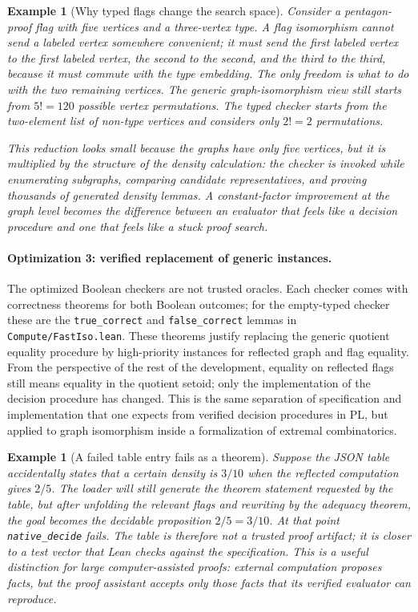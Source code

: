 \documentclass{article}
\newtheorem{example}[theorem]{Example}
\newcommand{\lean}[1]{\texttt{#1}}
\begin{document}
\begin{example}[Why typed flags change the search space]
  Consider a pentagon-proof flag with five vertices and a three-vertex type.
  A flag isomorphism cannot send a labeled vertex somewhere convenient; it must
  send the first labeled vertex to the first labeled vertex, the second to the
  second, and the third to the third, because it must commute with the type
  embedding.  The only freedom is what to do with the two remaining vertices.
  The generic graph-isomorphism view still starts from $5! = 120$ possible
  vertex permutations.  The typed checker starts from the two-element list of
  non-type vertices and considers only $2! = 2$ permutations.

  This reduction looks small because the graphs have only five vertices, but
  it is multiplied by the structure of the density calculation: the checker is
  invoked while enumerating subgraphs, comparing candidate representatives,
  and proving thousands of generated density lemmas.  A constant-factor
  improvement at the graph level becomes the difference between an evaluator
  that feels like a decision procedure and one that feels like a stuck proof
  search.
\end{example}

\paragraph{Optimization 3: verified replacement of generic instances.}
The optimized Boolean checkers are not trusted oracles.  Each checker comes
with correctness theorems for both Boolean outcomes; for the empty-typed
checker these are the \lean{true\_correct} and \lean{false\_correct} lemmas in
\lean{Compute/FastIso.lean}.  These theorems justify replacing the generic
quotient equality procedure by high-priority instances for reflected graph and
flag equality.  From the perspective of the rest of the development, equality
on reflected flags still means equality in the quotient setoid; only the
implementation of the decision procedure has changed.
This is the same separation of specification and implementation that one
expects from verified decision procedures in PL, but applied to graph
isomorphism inside a formalization of extremal combinatorics.

\begin{example}[A failed table entry fails as a theorem]
  Suppose the JSON table accidentally states that a certain density is
  $3/10$ when the reflected computation gives $2/5$.  The loader will still
  generate the theorem statement requested by the table, but after unfolding
  the relevant flags and rewriting by the adequacy theorem, the goal becomes
  the decidable proposition $2/5 = 3/10$.  At that point
  \lean{native\_decide} fails.  The table is therefore not a trusted proof
  artifact; it is closer to a test vector that Lean checks against the
  specification.  This is a useful distinction for large computer-assisted
  proofs: external computation proposes facts, but the proof assistant accepts
  only those facts that its verified evaluator can reproduce.
\end{example}
\end{document}
